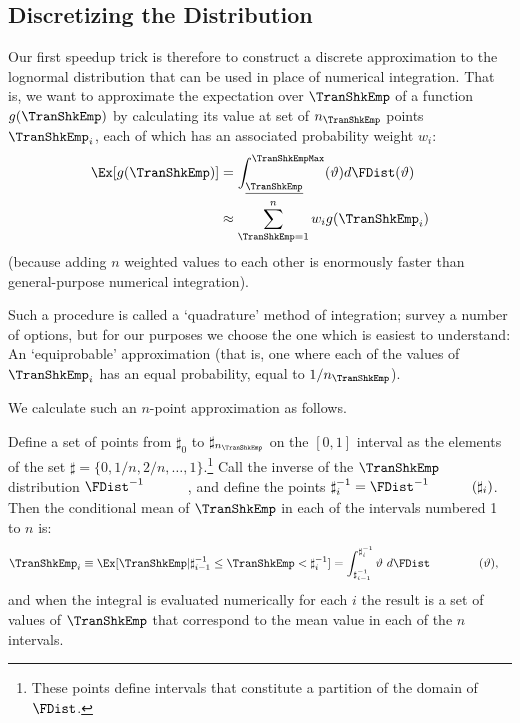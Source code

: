 \documentclass[titlepage, headings=optiontotocandhead]{\econtex}
\begin{document}
\hypertarget{Discretizing-the-Distribution}{}
\subsection{Discretizing the Distribution}
Our first speedup trick is therefore to construct a discrete approximation to the lognormal distribution that can be used in place of numerical integration.  That is, we want to approximate the expectation over $\TranShkEmp$ of a function $g(\TranShkEmp)$ by calculating its value at set of $n_{\TranShkEmp}$ points $\TranShkEmp_{i}$, each of which has an associated probability weight $w_{i}$:
\begin{equation*}\begin{gathered}\begin{aligned}
      \Ex[g(\TranShkEmp)] & = \int_{\TranShkEmpMin}^{\TranShkEmpMax}(\TranShkEmpDummy)d\FDist(\TranShkEmpDummy) \\
      & \approx \sum_{\TranShkEmp = 1}^{n}w_{i}g(\TranShkEmp_{i})
    \end{aligned}\end{gathered}\end{equation*}
(because adding $n$ weighted values to each other is enormously faster than general-purpose numerical integration).

Such a procedure is called a `quadrature' method of integration; \cite{Tanaka2013-bc} survey a number of options, but for our purposes we choose the one which is easiest to understand: An `equiprobable' approximation (that is, one where each of the values of $\TranShkEmp_{i}$ has an equal probability, equal to $1/n_{\TranShkEmp}$).

We calculate such an $n$-point approximation as follows.

Define a set of points from $\sharp_{0}$ to $\sharp_{n_{\TranShkEmp}}$ on the $[0,1]$ interval
as the elements of the set $\sharp = \{0,1/n,2/n, \ldots,1\}$.\footnote{These points define intervals that constitute a partition of the domain of $\FDist$.}  Call the inverse of the $\TranShkEmp$ distribution $\FDist^{-1}_{\phantom{\TranShkEmp}}$, and define the
points $\sharp^{-1}_{i} = \FDist^{-1}_{\phantom{\TranShkEmp}}(\sharp_{i})$.  Then
the conditional mean of $\TranShkEmp$ in each of the intervals numbered 1 to $n$ is:
\begin{equation}\begin{gathered}\begin{aligned}
      \TranShkEmp_{i} \equiv \Ex[\TranShkEmp | \sharp_{i-1}^{-1} \leq \TranShkEmp < \sharp_{i}^{-1}]  & = \int_{\sharp^{-1}_{i-1}}^{\sharp^{-1}_{i}} \vartheta ~ d\FDist_{\phantom{\TranShkEmp}}(\vartheta)  ,
\end{aligned}\end{gathered}\end{equation}
and when the integral is evaluated numerically for each $i$ the result is a set of values of $\TranShkEmp$ that correspond to the mean value in each of the $n$ intervals.
\end{document}
